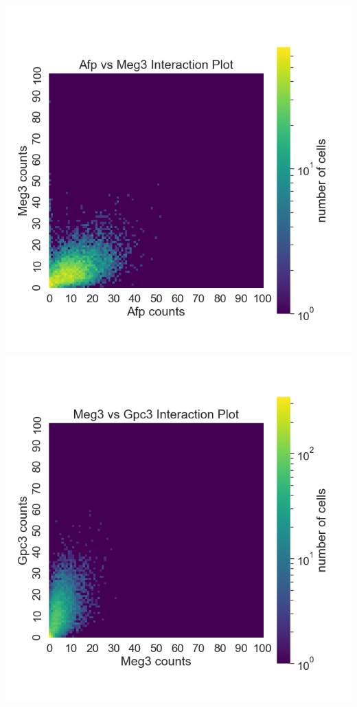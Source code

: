 \documentclass[
]{article}
\begin{document}
\includegraphics{../analysis/eda/h5-plots/Gene1-Afp-vs-Gene2-Meg3-hm.png}
\includegraphics{../analysis/eda/h5-plots/Gene1-Meg3-vs-Gene2-Gpc3-hm.png}
\end{document}
